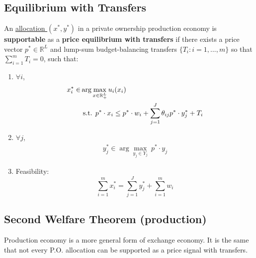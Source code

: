 \documentclass[11pt]{elegantbook}
\begin{document}
\subsection{Equilibrium with Transfers}
\begin{definition}
\normalfont
    An \underline{allocation $(x^*,y^*)$} in a private ownership production economy is \textbf{supportable} as a \textbf{price equilibrium with transfers} if there exists a price vector $p^*\in \mathbb{R}^L$ and lump-sum budget-balancing transfers $\{T_i:i=1,...,m\}$ so that $\sum_{i=1}^m T_i=0$, such that:
    \begin{enumerate}
        \item $\forall i$,
        \begin{equation}
            \begin{aligned}
                x_i^*\in &\arg\max_{x\in \mathbb{R}^L_+}u_i(x_i)\\
                &\textnormal{ s.t. } p^*\cdot x_i\leq p^*\cdot w_i +\sum_{j=1}^J\theta_{ij}p^*\cdot y^*_j + T_i
            \end{aligned}
            \nonumber
        \end{equation}
        \item $\forall j$,
        \begin{equation}
            \begin{aligned}
                y_j^*\in \arg\max_{y_j\in Y_j}\ p^*\cdot y_j
            \end{aligned}
            \nonumber
        \end{equation}
        \item Feasibility: $$\sum_{i=1}^m x_i^*=\sum_{j=1}^J y_j^*+\sum_{i=1}^m w_i$$
    \end{enumerate}
\end{definition}

\subsection{Second Welfare Theorem (production)}
Production economy is a more general form of exchange economy. It is the same that not every P.O. allocation can be supported as a price signal with transfers.
\end{document}

